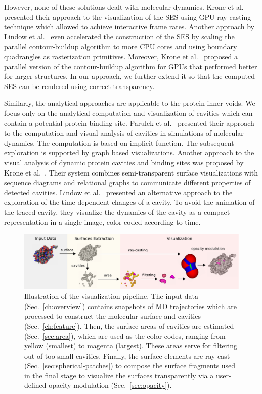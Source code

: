 However, none of these solutions dealt with molecular dynamics. 
Krone et al.~\cite{krone2009interactive} presented their approach to the visualization of the SES using GPU ray-casting technique which allowed to achieve interactive frame rates. 
Another approach by Lindow et al.~\cite{lindow2010accelerated} even accelerated the construction of the SES by scaling the parallel contour-buildup algorithm to more CPU cores and using boundary quadrangles as rasterization primitives.
Moreover, Krone et al.~\cite{krone2011parallel} proposed a parallel version of the contour-buildup algorithm for GPUs that performed better for larger structures.
In our approach, we further extend it so that the computed SES can be rendered using correct transparency.

Similarly, the analytical approaches are applicable to the protein inner voids. 
We focus only on the analytical computation and visualization of cavities which can contain a potential protein binding site.
Parulek et al.~\cite{parulek2013visual} presented their approach to the computation and visual analysis of cavities in simulations of molecular dynamics.
The computation is based on implicit function. 
The subsequent exploration is supported by graph based visualizations.
Another approach to the visual analysis of dynamic protein cavities and binding sites was proposed by Krone et al.~\cite{Krone2014}.
Their system combines semi-transparent surface visualizations with sequence diagrams and relational graphs to communicate different properties of detected cavities.
Lindow et al.~\cite{Lindow2013} presented an alternative approach to the exploration of the time-dependent changes of a cavity. 
To avoid the animation of the traced cavity, they visualize the dynamics of the cavity as a compact representation in a single image, color coded according to time. 

\begin{figure}[tb]
  \centering
  \includegraphics[width=\textwidth]{image/overview_final.pdf}
  \caption{Illustration of the visualization pipeline. The input data (Sec.~\ref{ch:overview}) contains snapshots of MD trajectories which are processed to construct the molecular surface and cavities (Sec.~\ref{ch:feature}). Then, the surface areas of cavities are estimated (Sec.~\ref{sec:area}), which are used as the color codes, ranging from yellow (smallest) to magenta (largest). These areas serve for filtering out of too small cavities. Finally, the surface elements are ray-cast (Sec.~\ref{sec:spherical-patches}) to compose the surface fragments used in the final stage to visualize the surfaces transparently via a user-defined opacity modulation (Sec.~\ref{sec:opacity}).}
	\label{fig:overview}
\end{figure}

